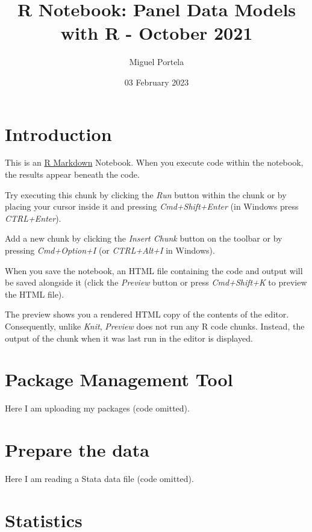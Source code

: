 \documentclass[
]{article}
\title{R Notebook: Panel Data Models with R - October 2021}
\author{Miguel Portela}
\date{03 February 2023}
\begin{document}
\maketitle

\hypertarget{introduction}{%
\section{Introduction}\label{introduction}}

This is an \href{http://rmarkdown.rstudio.com}{R Markdown} Notebook.
When you execute code within the notebook, the results appear beneath
the code.

Try executing this chunk by clicking the \emph{Run} button within the
chunk or by placing your cursor inside it and pressing
\emph{Cmd+Shift+Enter} (in Windows press \emph{CTRL+Enter}).

Add a new chunk by clicking the \emph{Insert Chunk} button on the
toolbar or by pressing \emph{Cmd+Option+I} (or \emph{CTRL+Alt+I} in
Windows).

When you save the notebook, an HTML file containing the code and output
will be saved alongside it (click the \emph{Preview} button or press
\emph{Cmd+Shift+K} to preview the HTML file).

The preview shows you a rendered HTML copy of the contents of the
editor. Consequently, unlike \emph{Knit}, \emph{Preview} does not run
any R code chunks. Instead, the output of the chunk when it was last run
in the editor is displayed.

\hypertarget{package-management-tool}{%
\section{Package Management Tool}\label{package-management-tool}}

Here I am uploading my packages (code omitted).

\hypertarget{prepare-the-data}{%
\section{Prepare the data}\label{prepare-the-data}}

Here I am reading a Stata data file (code omitted).

\hypertarget{statistics}{%
\section{Statistics}\label{statistics}}
\end{document}
